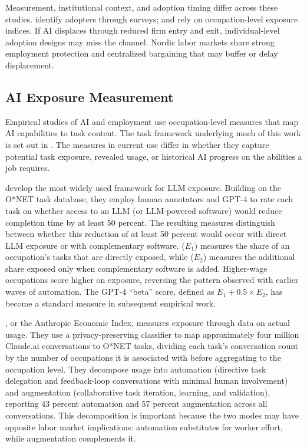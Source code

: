 \documentclass[12pt]{article}
\begin{document}
Measurement, institutional context, and adoption timing differ across these studies. \cite{humlum2026} identify adopters through surveys; \cite{brynjolfsson2025} and \cite{lodefalk2026} rely on occupation-level exposure indices. If AI displaces through reduced firm entry and exit, individual-level adoption designs may miss the channel. Nordic labor markets share strong employment protection and centralized bargaining that may buffer or delay displacement.


\subsection{AI Exposure Measurement}

Empirical studies of AI and employment use occupation-level measures that map AI capabilities to task content. The task framework underlying much of this work is set out in \citep{autor2003skill, acemoglu2011, acemoglu2018race, acemoglu2019automation}. The measures in current use differ in whether they capture potential task exposure, revealed usage, or historical AI progress on the abilities a job requires.

\cite{eloundou2024} develop the most widely used framework for LLM exposure. Building on the O*NET task database, they employ human annotators and GPT-4 to rate each task on whether access to an LLM (or LLM-powered software) would reduce completion time by at least 50 percent. The resulting measures distinguish between whether this reduction of at least 50 percent would occur with direct LLM exposure or with complementary software. ($E_1$) measures the share of an occupation's tasks that are directly exposed, while ($E_2$) measures the additional share exposed only when complementary software is added. Higher-wage occupations score higher on exposure, reversing the pattern observed with earlier waves of automation. The GPT-4 ``beta'' score, defined as $E_1 + 0.5 \times E_2$, has become a standard measure in subsequent empirical work.

\cite{handa2025}, or the Anthropic Economic Index, measures exposure through data on actual usage. They use a privacy-preserving classifier to map approximately four million Claude.ai conversations to O*NET tasks, dividing each task's conversation count by the number of occupations it is associated with before aggregating to the occupation level. They decompose usage into automation (directive task delegation and feedback-loop conversations with minimal human involvement) and augmentation (collaborative task iteration, learning, and validation), reporting 43 percent automation and 57 percent augmentation across all conversations. This decomposition is important because the two modes may have opposite labor market implications: automation substitutes for worker effort, while augmentation complements it. 
\end{document}
